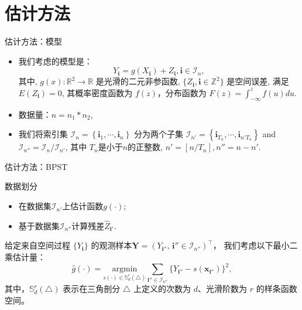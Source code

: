 \documentclass{beamer}
\begin{document}
\section{估计方法}
\begin{frame}{估计方法：模型}
\begin{itemize}
    \item 我们考虑的模型是：
        \begin{equation}\label{model:nonparbiregression}
            Y_{\mathbf{i}} = g(X_{\mathbf{i}})+Z_{\mathbf{i}}, \mathbf{i}\in \mathcal{I}_n,
        \end{equation}
其中, $g(x):\mathbb{R}^2 \rightarrow \mathbb{R}$ 是光滑的二元非参函数,  $\{Z_{\mathbf{i}},\mathbf{i}\in\mathbb{Z}^2\}$ 是空间误差, 满足 $E(Z_{\mathbf{i}})=0$, 其概率密度函数为 $f(z)$，分布函数为 $F(z)=\int_{-\infty}^{z}f(u)du$.
    \item 数据量：$n = n_1*n_2$,
    \item 我们将索引集 $\mathcal{I}_n=\left\{\mathbf{i}_1,\cdots,\mathbf{i}_n\right\}$ 分为两个子集 $\mathcal{I}_{n'}=\left\{\mathbf{i}_{T_n},\cdots,\mathbf{i}_{n'T_n}\right\}$ and $ \mathcal{I}_{n''} = \mathcal{I}_{n}/\mathcal{I}_{n'}$, 其中 $T_{n}$是小于$n$的正整数, $n' = [n/T_{n}], n''=n-n'$.
\end{itemize}
\end{frame}




\begin{frame}{估计方法：BPST}
\begin{block}{数据划分}
\begin{itemize}
    \item 在数据集$\mathcal{I}_{n'}$上估计函数$g(\cdot)$;
    \item 基于数据集$\mathcal{I}_{n''}$计算残差$\hat{Z}_{\mathbf{i}'}$.
\end{itemize}
\end{block}

给定来自空间过程 $\{Y_{\mathbf{i}}\}$ 的观测样本$\mathbf{Y}=(Y_{\mathbf{i}''},\,\mathbf{i}''\in\mathcal{I}_{n''})^\top$， 
我们考虑以下最小二乘估计量：
\begin{equation}
  \hat{g}(\cdot)
  = \underset{s(\cdot)\in \mathbb{S}_{d}^{r}(\triangle)}{\mathrm{argmin}}
  \sum_{\mathbf{i}''\in\mathcal{I}_{n''}}\!
  \bigl\{Y_{\mathbf{i}''}-s(\boldsymbol{x}_{\mathbf{i}''})\bigr\}^2,
\end{equation}
其中，$\mathbb{S}_{d}^{r}(\triangle)$ 表示在三角剖分 $\triangle$ 上定义的次数为 $d$、光滑阶数为 $r$ 的样条函数空间。

\end{frame}
\end{document}
